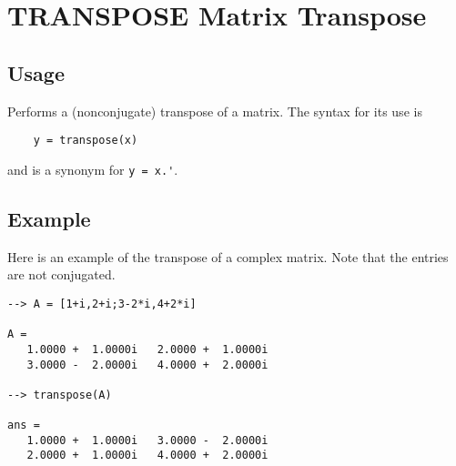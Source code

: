 \section{TRANSPOSE Matrix Transpose }

\subsection{Usage}

Performs a (nonconjugate) transpose of a matrix.  The syntax for
its use is
\begin{verbatim}
    y = transpose(x)
\end{verbatim}
and is a synonym for \verb|y = x.'|.
\subsection{Example}

Here is an example of the transpose of a complex matrix.  Note that
the entries are not conjugated.
\begin{verbatim}
--> A = [1+i,2+i;3-2*i,4+2*i]

A = 
   1.0000 +  1.0000i   2.0000 +  1.0000i 
   3.0000 -  2.0000i   4.0000 +  2.0000i 

--> transpose(A)

ans = 
   1.0000 +  1.0000i   3.0000 -  2.0000i 
   2.0000 +  1.0000i   4.0000 +  2.0000i 
\end{verbatim}
